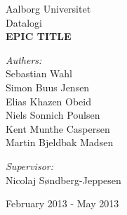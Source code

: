 \begin{titlingpage}
\color{fpcolor}
\centering
\vspace*{1.0cm}

\LARGE Aalborg Universitet\\[0.75cm]
\Large Datalogi\\[1.75cm]

\vspace{2.0cm}
{ \fontsize{26.2pt}{26.2pt} \bfseries EPIC TITLE}
\vspace{0.5cm}
\vspace{0.75cm}

\begin{minipage}{13.37cm}
  \begin{flushleft} \large
    \vspace{0pt}
    \emph{Authers:}\\
    Sebastian Wahl\\
    Simon Buus Jensen\\
    Elias Khazen Obeid\\
    Niels Sonnich Poulsen\\
    Kent Munthe Caspersen\\
    Martin Bjeldbak Madsen\\
  \end{flushleft}

  \begin{flushright} \large
    \vspace{-112pt}
    \emph{Supervisor:}\\
    Nicolaj Søndberg-Jeppesen
  \end{flushright}
\end{minipage}

\vfill

{\large February 2013 - May 2013}

\end{titlingpage}
